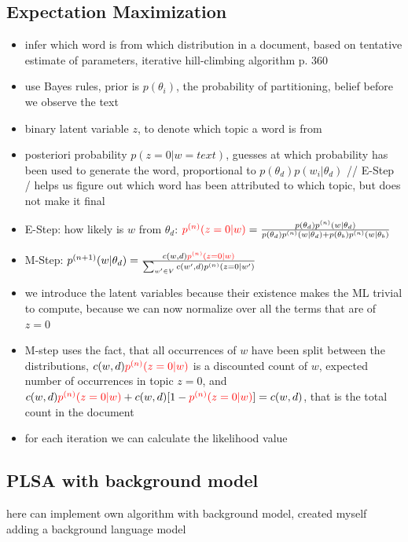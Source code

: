 \documentclass[11pt,a4paper,english,oneside]{book}
\numberwithin{equation}{chapter}
\begin{document}
\subsection{Expectation Maximization}
\begin{itemize}
	\item infer which word is from which distribution in a document, based on tentative estimate of parameters, iterative hill-climbing algorithm p. 360
	\item use Bayes rules, prior is  $p(\theta_i)$, the probability of partitioning, belief before we observe the text
	\item binary latent variable $z$, to denote which topic a word is from
	\item posteriori probability $p(z=0|w=text)$, guesses at which probability has been used to generate the word, proportional to $p(\theta_d)p(w_i | \theta_d)$ // E-Step / helps us figure out which word has been attributed to which topic, but does not make it final
	\item E-Step: how likely is $w$ from $\theta_d$: $\textcolor{red}{p^{(n)}(z=0|w)} = \frac{p(\theta_d)p^{(n)}(w|\theta_d)}{p(\theta_d)p^{(n)}(w|\theta_d) + p(\theta_b)p^{(n)}(w|\theta_b)}$
	\item M-Step: $p^{(n+1)}(w|\theta_d)=\frac{c(w,d) \textcolor{red}{p^{(n)}(z=0|w)}}{\sum_{w' \in V} c(w',d) p^{(n)}(z=0|w')} $
	\item we introduce the latent variables because their existence makes the ML trivial to compute, because we can now normalize over all the terms that are of $z=0$
	\item M-step uses the fact, that all occurrences of $w$ have been split between the distributions, $c(w,d) \textcolor{red}{p^{(n)}(z=0|w)}$ is a discounted count of $w$, expected number of occurrences in topic $z=0$, and $c(w,d) \textcolor{red}{p^{(n)}(z=0|w)} + c(w,d) [1-\textcolor{red}{p^{(n)}(z=0|w)}] = c(w,d)$, that is the total count in the document
	\item for each iteration we can calculate the likelihood value
\end{itemize}



\subsection{PLSA with background model}
here can implement own algorithm with background model, created myself
adding a background language model
\end{document}
